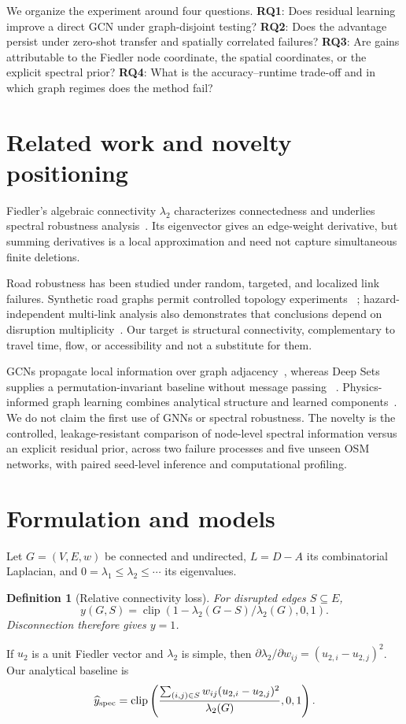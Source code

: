 \documentclass[11pt]{amsart}
\newtheorem{defn}{Definition}[section]
\begin{document}
We organize the experiment around four questions. \textbf{RQ1}: Does residual
learning improve a direct GCN under graph-disjoint testing? \textbf{RQ2}: Does
the advantage persist under zero-shot transfer and spatially correlated
failures? \textbf{RQ3}: Are gains attributable to the Fiedler node coordinate,
the spatial coordinates, or the explicit spectral prior? \textbf{RQ4}: What is
the accuracy--runtime trade-off and in which graph regimes does the method fail?

\section{Related work and novelty positioning}
Fiedler's algebraic connectivity $\lambda_2$ characterizes connectedness and
underlies spectral robustness analysis~\cite{fiedler1973,jamakovic2008}.
Its eigenvector gives an edge-weight derivative, but summing derivatives is a
local approximation and need not capture simultaneous finite deletions.

Road robustness has been studied under random, targeted, and localized link
failures. Synthetic road graphs permit controlled topology experiments
~\cite{sohouenou2020}; hazard-independent multi-link analysis also demonstrates
that conclusions depend on disruption multiplicity~\cite{sohouenou2021}. Our
target is structural connectivity, complementary to travel time, flow, or
accessibility and not a substitute for them.

GCNs propagate local information over graph adjacency~\cite{kipf2017}, whereas
Deep Sets supplies a permutation-invariant baseline without message passing
~\cite{zaheer2017}. Physics-informed graph learning combines analytical
structure and learned components~\cite{sanchezgonzalez2018}. We do not claim
the first use of GNNs or spectral robustness. The novelty is the controlled,
leakage-resistant comparison of node-level spectral information versus an
explicit residual prior, across two failure processes and five unseen OSM
networks, with paired seed-level inference and computational profiling.

\section{Formulation and models}
Let $G=(V,E,w)$ be connected and undirected, $L=D-A$ its combinatorial
Laplacian, and $0=\lambda_1\leq\lambda_2\leq\cdots$ its eigenvalues.
\begin{defn}[Relative connectivity loss]
For disrupted edges $S\subseteq E$,
\begin{equation}
y(G,S)=\operatorname{clip}\left(1-\lambda_2(G-S)/\lambda_2(G),0,1\right).
\label{eq:target}
\end{equation}
Disconnection therefore gives $y=1$.
\end{defn}
If $u_2$ is a unit Fiedler vector and $\lambda_2$ is simple, then
$\partial\lambda_2/\partial w_{ij}=(u_{2,i}-u_{2,j})^2$. Our analytical
baseline is
\begin{equation}
\widehat y_{\rm spec}=\operatorname{clip}\left(
\frac{\sum_{(i,j)\in S}w_{ij}(u_{2,i}-u_{2,j})^2}{\lambda_2(G)},0,1\right).
\label{eq:spectral}
\end{equation}
\end{document}
